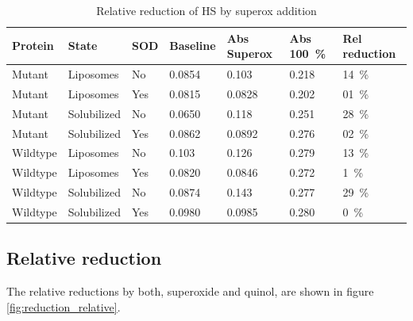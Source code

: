 \begin{table}
	\centering
	\begin{tabu}{lllllll}
		\toprule
		Protein & State & SOD & Baseline & Abs Superox & Abs \SI{100}{\percent} & Rel reduction \\
		\midrule
		Mutant   & Liposomes   & No   &          0.0854    &            0.103               &   0.218         &  \SI{14}{\percent}   \\
		Mutant   & Liposomes   & Yes  &            0.0815  &              0.0828            &     0.202       &  \SI{01}{\percent}  \\
		Mutant   & Solubilized & No   &          0.0650    &            0.118               &   0.251         &  \SI{28}{\percent}   \\
		Mutant   & Solubilized & Yes  &            0.0862  &              0.0892            &     0.276       &  \SI{02}{\percent}  \\
		Wildtype & Liposomes   & No   &          0.103     &            0.126               &   0.279         &  \SI{13}{\percent}  \\
		Wildtype & Liposomes   & Yes  &            0.0820  &              0.0846            &     0.272       &  \SI{1 }{\percent} \\
		Wildtype & Solubilized & No   &          0.0874    &            0.143               &   0.277         &  \SI{29}{\percent}  \\
		Wildtype & Solubilized & Yes  &            0.0980  &              0.0985            &     0.280       &  \SI{0 }{\percent} \\
		\bottomrule
	\end{tabu}
	\caption{Relative reduction of HS by superox addition}
	\label{tbl:reduction_superox}
\end{table}

\subsection{Relative reduction}

The relative reductions by both, superoxide and quinol, are shown in figure
\ref{fig:reduction_relative}.


